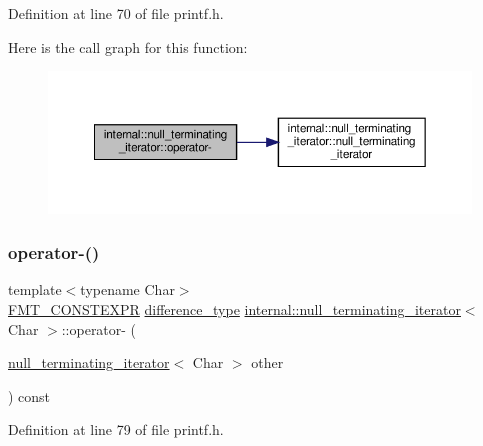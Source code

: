 Definition at line 70 of file printf.\+h.

Here is the call graph for this function\+:
\nopagebreak
\begin{figure}[H]
\begin{center}
\leavevmode
\includegraphics[width=350pt]{classinternal_1_1null__terminating__iterator_a73f50b864c88a4dabeab45e4fbc38e32_cgraph}
\end{center}
\end{figure}
\mbox{\label{classinternal_1_1null__terminating__iterator_a6cd34072debcabb89159560704c81c4a}} 
\subsubsection{\texorpdfstring{operator-\/()}{operator-()}\hspace{0.1cm}{\footnotesize\ttfamily [2/2]}}
{\footnotesize\ttfamily template$<$typename Char$>$ \\
\hyperlink{core_8h_a69201cb276383873487bf68b4ef8b4cd}{F\+M\+T\+\_\+\+C\+O\+N\+S\+T\+E\+X\+PR} \hyperlink{classinternal_1_1null__terminating__iterator_ad1a2aa728f679bdfdbdc644f1c43e819}{difference\+\_\+type} \hyperlink{classinternal_1_1null__terminating__iterator}{internal\+::null\+\_\+terminating\+\_\+iterator}$<$ Char $>$\+::operator-\/ (\begin{DoxyParamCaption}\item[{\hyperlink{classinternal_1_1null__terminating__iterator}{null\+\_\+terminating\+\_\+iterator}$<$ Char $>$}]{other }\end{DoxyParamCaption}) const\hspace{0.3cm}{\ttfamily [inline]}}



Definition at line 79 of file printf.\+h.

